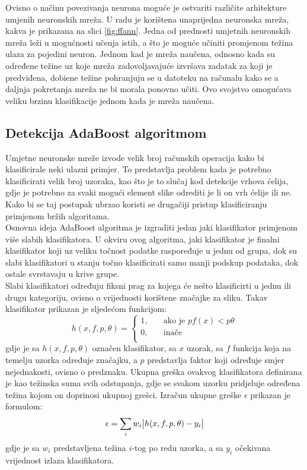 \documentclass[times, utf8, zavrsni, numeric]{fer}
\begin{document}
Ovisno o načinu povezivanja neurona moguće je ostvariti različite arhitekture umjenih neuronskih mreža. 
U radu je korištena unaprijedna neuronska mreža, kakva je prikazana na slici \ref{fig:ffann}.
Jedna od prednosti umjetnih neuronskih mreža leži u mogućnosti učenja istih, a što je moguće učiniti promjenom težina ulaza za pojedini neuron.
Jednom kad je mreža naučena, odnosno kada su određene težine uz koje mreža zadovoljavajuće izvršava zadatak za koji je predviđena, dobiene težine pohranjuju se u datoteku na računalu kako se a daljnja pokretanja mreža ne bi morala ponovno učiti.
Ovo svojstvo omogućava veliku brzinu klasifikacije jednom kada je mreža naučena.

\subsection{Detekcija AdaBoost algoritmom}
Umjetne neuronske mreže izvode velik broj računskih operacija kako bi klasificirale neki ulazni primjer.
To predstavlja problem kada je potrebno klasificirati velik broj uzoraka, kao što je to slučaj kod detekcije vrhova ćelija, gdje je potrebno za svaki mogući element slike odrediti je li on vrh ćelije ili ne.
Kako bi se taj postupak ubrzao koristi se drugačiji pristup klasificiranju primjenom bržih algoritama. \\

Osnovna ideja AdaBoost algoritma je izgraditi jedan jaki klasifikator primjenom više slabih klasifikatora.
U okviru ovog algoritma, jaki klasifikator je finalni klasifikator koji uz veliku točnost podatke raspoređuje u jednu od grupa, dok su slabi klasifikatori u stanju točno klasificirati samo manji podskup podataka, dok ostale svrstavaju u krive grupe.\\

Slabi klasifikatori određuju fiksni prag za kojega će nešto klasificirti u jednu ili drugu kategoriju, ovisno o vrijednosti korištene značajke za sliku. Takav klasifikator prikazan je sljedećom funkcijom:
\[
    h(x, f, p, \theta) = 
    \begin{cases}
    1,  & \quad \text{ako je } pf(x) < p\theta \\
    0,  & \quad \text{inače}\\
    \end{cases}
\]
gdje je sa $h(x, f, p, \theta)$ označen klasifikator, sa $x$ uzorak, sa $f$ funkcija koja na temelju uzorka određuje značajku, a $p$ predstavlja faktor koji određuje smjer nejednakosti, ovisno o predznaku.
Ukupna greška ovakvog klasifikatora definirana je kao težinska suma svih odstupanja, gdje se svakom uzorku pridjeluje određena težina kojom on doprinosi ukupnoj grešci.
Izračun ukupne greške $\epsilon$ prikazan je formulom:
\[
    \epsilon = \displaystyle \sum_{i}w_i \abs{h(x, f, p, \theta) - y_i} 
\]
gdje je sa $w_i$ predstavljena težina $i$-tog po redu uzorka, a sa $y_i$ očekivana vrijednost izlaza klasifikatora.\\
\end{document}
